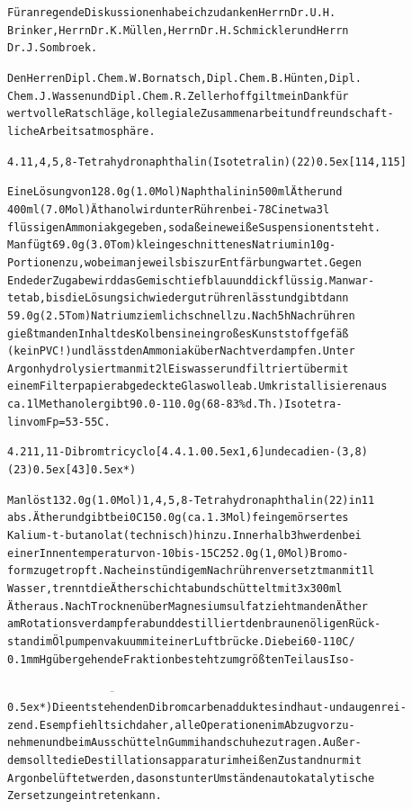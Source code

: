 \documentclass[a4paper,11pt]{article}
\begin{document}
\begin{alltt}
Für anregende Diskussionen habe ich zu danken Herrn Dr. U. H.
Brinker, Herrn Dr. K. Müllen, Herrn Dr. H. Schmickler und Herrn
Dr. J. Sombroek.

Den Herren Dipl. Chem. W. Bornatsch, Dipl. Chem. B. Hünten, Dipl.
Chem. J. Wassen und Dipl. Chem. R. Zellerhoff gilt mein Dank für
wertvolle Ratschläge, kollegiale Zusammenarbeit und freundschaft-
liche Arbeitsatmosphäre.

\newpage
{}


4.1  1‚4,5,8-Tetrahydronaphthalin (Isotetralin) (22) \raise0.5ex\hbox{[114,115]}

Eine Lösung von 128.0 g (1.0 Mol) Naphthalin in 500 ml Äther und
400 ml (7.0 Mol) Äthanol wird unter Rühren bei -78\degree{}C in etwa 3 l
flüssigen Ammoniak gegeben, so daß eine weiße Suspension entsteht.
Man fügt 69.0 g (3.0 Tom) klein geschnittenes Natrium in 10 g -
Portionen zu, wobei man jeweils bis zur Entfärbung wartet. Gegen
Ende der Zugabe wird das Gemisch tiefblau und dickflüssig. Man war-
tet ab, bis die Lösung sich wieder gut rühren lässt und gibt dann
59.0 g (2.5 Tom) Natrium ziemlich schnell zu. Nach 5 h Nachrühren
gießt man den Inhalt des Kolbens in ein großes Kunststoffgefäß
(kein PVC !) und lässt den Ammoniak über Nacht verdampfen. Unter
Argon hydrolysiert man mit 2 l Eiswasser und filtriert über mit
einem Filterpapier abgedeckte Glaswolle ab. Umkristallisieren aus
ca. 1 l Methanol ergibt 90.0 - 110.0 g (68 - 83 \% d.Th.) Isotetra-
lin vom Fp = 53 - 55\degree{}C.


4.2  11,11-Dibromtricyclo[4.4.1.0\raise0.5ex\hbox{1,6}]undecadien-(3,8) (23) \raise0.5ex\hbox{[43]} \leavevmode\raise0.5ex\hbox{*})

Man löst 132.0 g (1.0 Mol) 1,4,5,8-Tetrahydronaphthalin (22) in 1 1
abs. Äther und gibt bei 0\degree{}C 150.0 g (ca. 1.3 Mol) fein gemörsertes
Kalium-t-butanolat (technisch) hinzu. Innerhalb 3 h werden bei
einer Innentemperatur von -10\degree bis -15\degree{}C 252.0 g (1,0 Mol) Bromo-
form zugetropft. Nach einstündigem Nachrühren versetzt man mit 1 l
Wasser, trennt die Ätherschicht ab und schüttelt mit 3 x 300 ml
Äther aus. Nach Trocknen über Magnesiumsulfat zieht man den Äther
am Rotationsverdampfer ab und destilliert den braunen öligen Rück-
stand im Ölpumpenvakuum mit einer Luftbrücke. Die bei 60 - 110\degree{}C/
0.1 mm Hg übergehende Fraktion besteht zum größten Teil aus Iso-

\(\overline{\hspace{7cm}}\)
\leavevmode\raise0.5ex\hbox{*}) Die entstehenden Dibromcarbenaddukte sind haut- und augenrei-
   zend. Es empfiehlt sich daher, alle Operationen im Abzug vorzu-
   nehmen und beim Ausschütteln Gummihandschuhe zu tragen. Außer-
   dem sollte die Destillationsapparatur im heißen Zustand nur mit
   Argon belüftet werden, da sonst unter Umständen autokatalytische
   Zersetzung eintreten kann.


\end{alltt}
\end{document}
